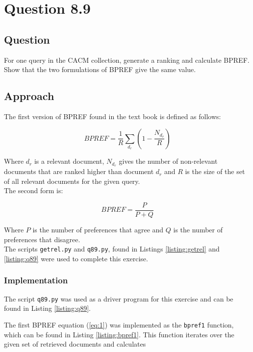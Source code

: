 \section{Question 8.9}

\subsection{Question}
For one query in the CACM collection, generate a ranking and calculate BPREF. Show that the two formulations of BPREF give the same value.

\subsection{Approach}
The first version of BPREF found in the text book is defined as follows:

\begin{equation}
\label{eq:1}
BPREF = \frac{1}{R} \sum_{d_r}(1 - \frac{N_{d_r}}{R})
\end{equation}

Where \(d_r\) is a relevant document, \(N_{d_r}\) gives the number of non-relevant documents that are ranked higher than document \(d_r\) and \(R\) is the size of the set of all relevant documents for the given query.\\

The second form is:

\begin{equation}
\label{eq:2}
BPREF = \frac{P}{P + Q}
\end{equation}


Where \(P\) is the number of preferences that agree and \(Q\) is the number of preferences that disagree.\\

The scripts \texttt{getrel.py} and \texttt{q89.py}, found in Listings \ref{listing:getrel} and \ref{listing:q89} were used to complete this exercise.

\subsubsection{Implementation}
The script \texttt{q89.py} was used as a driver program for this exercise and can be found in Listing \ref{listing:q89}.



The first BPREF equation (\ref{eq:1}) was implemented as the \texttt{bpref1} function, which can be found in Listing \ref{listing:bpref1}.  This function iterates over the given set of retrieved documents and calculates 


